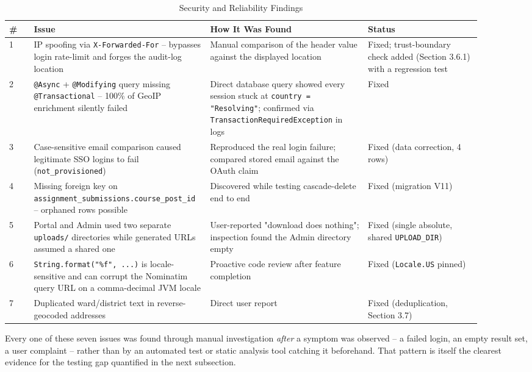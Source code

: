 \documentclass[12pt,a4paper]{report}
\begin{document}
\begin{longtable}{@{}p{0.05\linewidth}p{0.30\linewidth}p{0.32\linewidth}p{0.23\linewidth}@{}}
\caption{Security and Reliability Findings}
\label{tab:security-findings}\\
\toprule
\textbf{\#} & \textbf{Issue} & \textbf{How It Was Found} & \textbf{Status} \\
\midrule
\endhead
1 & IP spoofing via \texttt{X-Forwarded-For} -- bypasses login rate-limit and forges the audit-log location & Manual comparison of the header value against the displayed location & Fixed; trust-boundary check added (Section 3.6.1) with a regression test \\
2 & \texttt{@Async} + \texttt{@Modifying} query missing \texttt{@Transactional} -- 100\% of GeoIP enrichment silently failed & Direct database query showed every session stuck at \texttt{country = "Resolving"}; confirmed via \texttt{TransactionRequiredException} in logs & Fixed \\
3 & Case-sensitive email comparison caused legitimate SSO logins to fail (\texttt{not\_provisioned}) & Reproduced the real login failure; compared stored email against the OAuth claim & Fixed (data correction, 4 rows) \\
4 & Missing foreign key on \texttt{assignment\_submissions.course\_post\_id} -- orphaned rows possible & Discovered while testing cascade-delete end to end & Fixed (migration V11) \\
5 & Portal and Admin used two separate \texttt{uploads/} directories while generated URLs assumed a shared one & User-reported "download does nothing"; inspection found the Admin directory empty & Fixed (single absolute, shared \texttt{UPLOAD\_DIR}) \\
6 & \texttt{String.format("\%f", ...)} is locale-sensitive and can corrupt the Nominatim query URL on a comma-decimal JVM locale & Proactive code review after feature completion & Fixed (\texttt{Locale.US} pinned) \\
7 & Duplicated ward/district text in reverse-geocoded addresses & Direct user report & Fixed (deduplication, Section 3.7) \\
\bottomrule
\end{longtable}

Every one of these seven issues was found through manual
investigation \emph{after} a symptom was observed -- a failed login, an
empty result set, a user complaint -- rather than by an automated test
or static analysis tool catching it beforehand. That pattern is itself
the clearest evidence for the testing gap quantified in the next
subsection.
\end{document}

